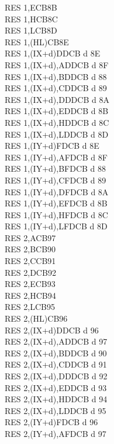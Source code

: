 \documentclass[12pt,twoside,openright,a4paper]{book}
\begin{document}
\begin{multicols}{3}
{\begin{tabbing}
		RES 1,E\>CB8B\\
		RES 1,H\>CB8C\\
		RES 1,L\>CB8D\\
		RES 1,(HL)\>CB8E\\
		RES 1,(IX+d)\>DDCB d 8E\\
		RES 1,(IX+d),A\UNDOC\>DDCB d 8F\\
		RES 1,(IX+d),B\UNDOC\>DDCB d 88\\
		RES 1,(IX+d),C\UNDOC\>DDCB d 89\\
		RES 1,(IX+d),D\UNDOC\>DDCB d 8A\\
		RES 1,(IX+d),E\UNDOC\>DDCB d 8B\\
		RES 1,(IX+d),H\UNDOC\>DDCB d 8C\\
		RES 1,(IX+d),L\UNDOC\>DDCB d 8D\\
		RES 1,(IY+d)\>FDCB d 8E\\
		RES 1,(IY+d),A\UNDOC\>FDCB d 8F\\
		RES 1,(IY+d),B\UNDOC\>FDCB d 88\\
		RES 1,(IY+d),C\UNDOC\>FDCB d 89\\
		RES 1,(IY+d),D\UNDOC\>FDCB d 8A\\
		RES 1,(IY+d),E\UNDOC\>FDCB d 8B\\
		RES 1,(IY+d),H\UNDOC\>FDCB d 8C\\
		RES 1,(IY+d),L\UNDOC\>FDCB d 8D\\
		RES 2,A\>CB97\\
		RES 2,B\>CB90\\
		RES 2,C\>CB91\\
		RES 2,D\>CB92\\
		RES 2,E\>CB93\\
		RES 2,H\>CB94\\
		RES 2,L\>CB95\\
		RES 2,(HL)\>CB96\\
		RES 2,(IX+d)\>DDCB d 96\\
		RES 2,(IX+d),A\UNDOC\>DDCB d 97\\
		RES 2,(IX+d),B\UNDOC\>DDCB d 90\\
		RES 2,(IX+d),C\UNDOC\>DDCB d 91\\
		RES 2,(IX+d),D\UNDOC\>DDCB d 92\\
		RES 2,(IX+d),E\UNDOC\>DDCB d 93\\
		RES 2,(IX+d),H\UNDOC\>DDCB d 94\\
		RES 2,(IX+d),L\UNDOC\>DDCB d 95\\
		RES 2,(IY+d)\>FDCB d 96\\
		RES 2,(IY+d),A\UNDOC\>FDCB d 97\\

\end{tabbing}}
\end{multicols}
\end{document}
